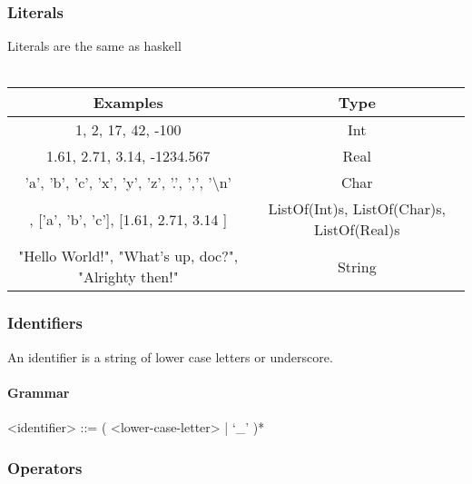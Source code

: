 \documentclass{article}
\begin{document}
\subsubsection{Literals}

Literals are the same as haskell \\ \\
\begin{tabular}{ |c|c| } 
\hline
Examples & Type \\ 
\hline
\hline
1, 2, 17, 42, -100 & Int \\ 
\hline
1.61, 2.71, 3.14, -1234.567 & Real \\ 
\hline
'a', 'b', 'c', 'x', 'y', 'z', '.', ',', '\textbackslash n' & Char \\
\hline
[1, 2, 3], ['a', 'b', 'c'], [1.61, 2.71, 3.14 ] &
ListOf(Int)s, ListOf(Char)s, ListOf(Real)s \\
\hline
"Hello World!", "What's up, doc?", "Alrighty then!" & String \\
\hline
\end{tabular}

\subsubsection{Identifiers}

An identifier is a string of lower case letters or underscore. 
\paragraph{Grammar}
\begin{grammar}
<identifier> ::= ( <lower-case-letter> | `_' )*
\end{grammar}

\subsubsection{Operators}
\end{document}
